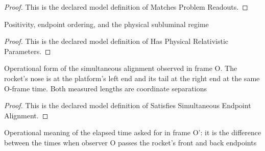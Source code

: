 \begin{proof}
  This is the declared model definition of Matches Problem Readouts.
\end{proof}
\begin{definition}
  \label{def:physics:phyx-mini-0552:phyxminiproblems-problemphyxmini0552-hasphysicalrelativisticparameters}
  Positivity, endpoint ordering, and the physical subluminal regime
\end{definition}
\begin{proof}
  This is the declared model definition of Has Physical Relativistic Parameters.
\end{proof}
\begin{definition}
  \label{def:physics:phyx-mini-0552:phyxminiproblems-problemphyxmini0552-satisfiessimultaneousendpointalignment}
  Operational form of the simultaneous alignment observed in frame O. The rocket's nose is at the platform's left end and its tail at the right end at the same O-frame time. Both measured lengths are coordinate separations
\end{definition}
\begin{proof}
  This is the declared model definition of Satisfies Simultaneous Endpoint Alignment.
\end{proof}
\begin{definition}
  \label{def:physics:phyx-mini-0552:phyxminiproblems-problemphyxmini0552-satisfiesrocketframetraversalmeasurement}
  Operational meaning of the elapsed time asked for in frame O': it is the difference between the times when observer O passes the rocket's front and back endpoints
\end{definition}
